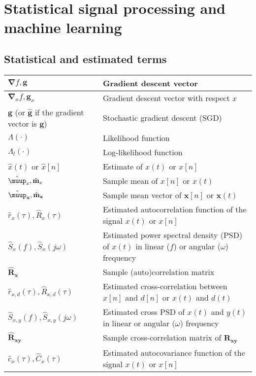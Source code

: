 \documentclass{article}
\begin{document}
\section{Statistical signal processing and machine learning}
\subsection{Statistical and estimated terms}
\begin{xltabular}{\textwidth}{XX}
    \(\boldsymbol{\nabla}f, \mathbf{g}\) & Gradient descent vector \\ \hline
    \(\boldsymbol{\nabla}_{x}f, \mathbf{g}_{x}\) & Gradient descent vector with respect \(x\)\\ \hline
    \(\mathbf{g}\) (or \(\hat{\mathbf{g}}\) if the gradient vector is \(\mathbf{g}\)) & Stochastic gradient descent (SGD) \\ \hline
    \(\Lambda(\cdot)\) & Likelihood function\\ \hline
    \(\Lambda_l(\cdot)\) & Log-likelihood function\\ \hline
    \(\hat{x}(t)\) or \(\hat{x}[n]\) & Estimate of \(x(t)\) or \(x[n]\)\\ \hline
    \(\hat{\boldsymbol{\muup}}_x, \hat{\mathbf{m}}_x\) & Sample mean of \(x[n]\) or \(x(t)\) \\ \hline
    \(\hat{\boldsymbol{\muup}}_\mathbf{x}, \hat{\mathbf{m}}_\mathbf{x}\) & Sample mean vector of \(\mathbf{x}[n]\) or \(\mathbf{x}(t)\)\\ \hline
    \(\hat{r}_x(\tau), \hat{R}_x(\tau)\) & Estimated autocorrelation function of the signal \(x(t)\) or \(x[n]\)\\ \hline
    \(\hat{S}_x(f), \hat{S}_x(j\omega)\) & Estimated power spectral density (PSD) of \(x(t)\) in linear (\(f\)) or angular (\(\omega\)) frequency\\ \hline
    \(\hat{\mathbf{R}}_\mathbf{x}\) & Sample (auto)correlation matrix \\ \hline
    \(\hat{r}_{x,d}(\tau), \hat{R}_{x,d}(\tau)\) & Estimated cross-correlation between \(x[n]\) and \(d[n]\) or \(x(t)\) and \(d(t)\)\\ \hline
    \(\hat{S}_{x,y}(f), \hat{S}_{x,y}(j\omega)\) & Estimated cross PSD of \(x(t)\) and \(y(t)\) in linear or angular (\(\omega\)) frequency\\ \hline
    \(\hat{\mathbf{R}}_\mathbf{xy}\) & Sample cross-correlation matrix of \(\mathbf{R}_\mathbf{xy}\) \\ \hline
    \(\hat{c}_x(\tau), \hat{C}_x(\tau)\) & Estimated autocovariance function of the signal \(x(t)\) or \(x[n]\)\\ \hline

\end{xltabular}
\end{document}
